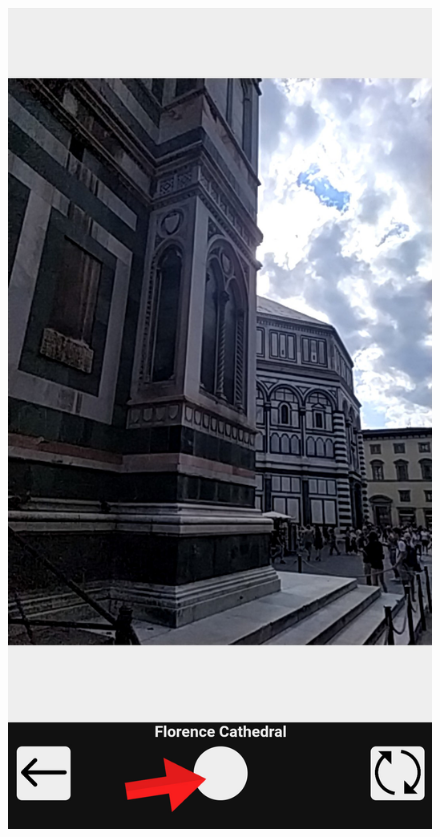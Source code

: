 \documentclass{beamer}
\begin{document}
\begin{frame}
\begin{columns}
\begin{itemize}
\begin{figure}[!h]
 			\includegraphics[scale=0.1]{"Immagini/open_camera4.jpg"}
 		\end{figure}
\end{itemize}
\end{columns}
\end{frame}
\end{document}
